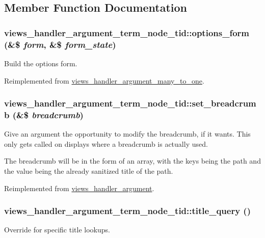 \subsection{Member Function Documentation}
\hypertarget{classviews__handler__argument__term__node__tid_af00552a1378333434154989c051d0e98}{
\subsubsection[{options\_\-form}]{\setlength{\rightskip}{0pt plus 5cm}views\_\-handler\_\-argument\_\-term\_\-node\_\-tid::options\_\-form (\&\$ {\em form}, \/  \&\$ {\em form\_\-state})}}
\label{classviews__handler__argument__term__node__tid_af00552a1378333434154989c051d0e98}
Build the options form. 

Reimplemented from \hyperlink{classviews__handler__argument__many__to__one_add3ed7d59f17d79f48ef8f47e049cb92}{views\_\-handler\_\-argument\_\-many\_\-to\_\-one}.\hypertarget{classviews__handler__argument__term__node__tid_aef9753aafd176e2e63c4a99be1177175}{
\subsubsection[{set\_\-breadcrumb}]{\setlength{\rightskip}{0pt plus 5cm}views\_\-handler\_\-argument\_\-term\_\-node\_\-tid::set\_\-breadcrumb (\&\$ {\em breadcrumb})}}
\label{classviews__handler__argument__term__node__tid_aef9753aafd176e2e63c4a99be1177175}
Give an argument the opportunity to modify the breadcrumb, if it wants. This only gets called on displays where a breadcrumb is actually used.

The breadcrumb will be in the form of an array, with the keys being the path and the value being the already sanitized title of the path. 

Reimplemented from \hyperlink{classviews__handler__argument_a06263489052be463efd3c4afdf73851d}{views\_\-handler\_\-argument}.\hypertarget{classviews__handler__argument__term__node__tid_a9f858ee5c343f6a14b87a320316710f0}{
\subsubsection[{title\_\-query}]{\setlength{\rightskip}{0pt plus 5cm}views\_\-handler\_\-argument\_\-term\_\-node\_\-tid::title\_\-query ()}}
\label{classviews__handler__argument__term__node__tid_a9f858ee5c343f6a14b87a320316710f0}
Override for specific title lookups. 


